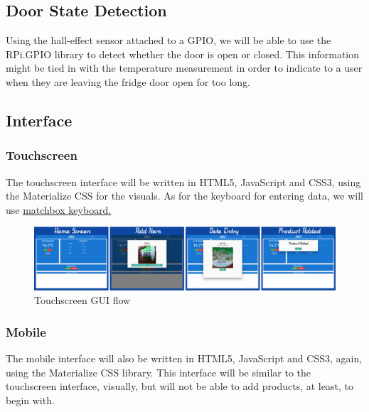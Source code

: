 \documentclass[10pt]{article}
\begin{document}
\subsection{Door State Detection}

Using the hall-effect sensor attached to a GPIO, we will be able to use the RPi.GPIO library to detect whether the door is open or closed. This information might be tied in with the temperature measurement in order to indicate to a user when they are leaving the fridge door open for too long.

\subsection{Interface}

\subsubsection{Touchscreen}
The touchscreen interface will be written in HTML5, JavaScript and CSS3, using the Materialize CSS for the visuals. As for the keyboard for entering data, we will use \hyperref[https://github.com/xlab/matchbox-keyboard]{matchbox keyboard.}

\begin{figure}[h]
\centering
\caption{Touchscreen GUI flow}
\label{Touchscreen GUI flow}
\includegraphics[width=18cm]{images/GUI-flow.png}
\end{figure}


\subsubsection{Mobile}

The mobile interface will also be written in HTML5, JavaScript and CSS3, again, using the Materialize CSS library. This interface will be similar to the touchscreen interface, visually, but will not be able to add products, at least, to begin with.
\end{document}

